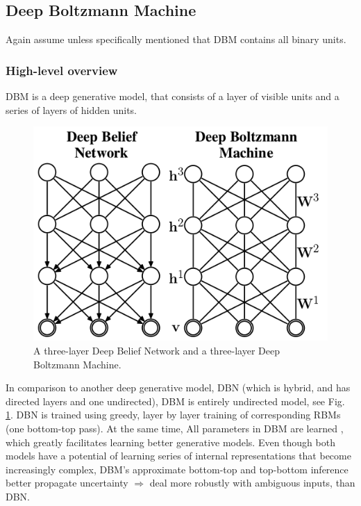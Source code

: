 \subsection{Deep Boltzmann Machine}
Again assume unless specifically mentioned that DBM contains all binary units.
\subsubsection{High-level overview}
\textbullet{} DBM is a deep generative model, that consists of a layer of visible units and a series of layers of hidden units.
\begin{figure}[h]
\begin{mdframed}
\includegraphics[scale=0.4]{img/dbn_dbm.png}
\centering
\caption{A three-layer Deep Belief Network and a three-layer Deep Boltzmann Machine.}
\label{fig:dbn_dbm}
\end{mdframed}
\end{figure}
In comparison to another deep generative model, DBN (which is hybrid, and has directed layers and one undirected), DBM is entirely undirected model, see Fig. \ref{fig:dbn_dbm}. DBN is trained using greedy, layer by layer training of corresponding RBMs (one bottom-top pass). At the same time, All parameters in DBM are learned , which greatly facilitates learning better generative models. Even though both models have a potential of learning series of internal representations that become increasingly complex, DBM's approximate bottom-top and top-bottom inference better propagate uncertainty $\Rightarrow$ deal more robustly with ambiguous inputs, than DBN.
\\
